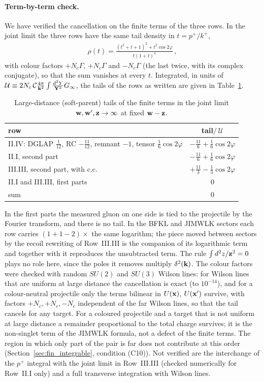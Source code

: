 \paragraph{Term-by-term check.} We have verified the cancellation on the finite terms of the three rows. In the joint limit the three rows have the same tail density in $t=p^+/k^+$,
\begin{align}\label{eq:dg_taildens}
\rho(t)=\frac{(t^2+t+1)^2+t^2\cos2\varphi}{t(1+t)^4}\,,
\end{align}
with colour factors $+N_c\Gamma$, $+N_c\Gamma$ and $-N_c\Gamma$ (the last twice, with its complex conjugate), so that the sum vanishes at every $t$. Integrated, in units of $\mathcal U\equiv2N_c\,\mathcal C\frac{4\pi}{\mathbf{k}^2}\int\frac{d^2Y}{\mathbf{Y}^2}G_\infty$, the tails of the rows as written are given in Table~\ref{tab:tails}.
\begin{table}[h]\centering
\begin{tabular}{lc}\hline
row & tail$/\,\mathcal U$\\\hline
II.IV: DGLAP $\frac1{12}$, RC $-\frac{11}{12}$, remnant $-1$, tensor $\frac16\cos2\varphi$ & $-\frac{11}{6}+\frac16\cos2\varphi$\\
II.I, second part & $-\frac{11}{6}+\frac16\cos2\varphi$\\
III.III, second part, with c.c. & $+\frac{11}{3}-\frac13\cos2\varphi$\\
II.I and III.III, first parts & $0$\\\hline
sum & $0$\\\hline
\end{tabular}
\caption{Large-distance (soft-parent) tails of the finite terms in the joint limit $\mathbf{w},\mathbf{w}',\mathbf{z}\to\infty$ at fixed $\mathbf{w}-\mathbf{z}$.}\label{tab:tails}
\end{table}
In the first parts the measured gluon on one side is tied to the projectile by the Fourier transform, and there is no tail. In the BFKL and JIMWLK sectors each row carries $(1+1-2)\times$ the same logarithm; the piece moved between sectors by the recoil rewriting of Row~III.III is the companion of its logarithmic term and together with it reproduces the unsubtracted term. The rule $\int d^2z/\mathbf{z}^2=0$ plays no role here, since the poles it removes multiply $\delta^2(\mathbf{k})$. The colour factors were checked with random $SU(2)$ and $SU(3)$ Wilson lines: for Wilson lines that are uniform at large distance the cancellation is exact (to $10^{-14}$), and for a colour-neutral projectile only the terms bilinear in $U(\mathbf{x})$, $U(\mathbf{x}')$ survive, with factors $+N_c,+N_c,-N_c$ independent of the far Wilson lines, so that the tail cancels for any target. For a coloured projectile and a target that is not uniform at large distance a remainder proportional to the total charge survives; it is the non-singlet term of the JIMWLK formula, not a defect of the finite terms. The region in which only part of the pair is far does not contribute at this order (Section~\ref{sec:fin_integrable}, condition (C10)). Not verified are the interchange of the $p^+$ integral with the joint limit in Row~III.III (checked numerically for Row~II.I only) and a full transverse integration with Wilson lines.
